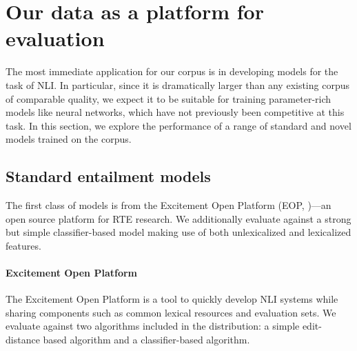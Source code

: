 \section{Our data as a platform for evaluation}

The most immediate application for our corpus is in developing models for the task of NLI. In particular, since it is dramatically larger than any existing corpus of comparable quality, we expect it to be suitable for training parameter-rich models like neural networks, which have not previously been competitive at this task. In this section, we explore the performance of a range of standard and novel models trained on the corpus.

\subsection{Standard entailment models}

The first class of models is from the Excitement Open
  Platform (EOP,
  \citealt{pado2014design,magnini2014excitement})---an open source platform for RTE research.
We additionally evaluate against a strong but simple classifier-based model 
  making use of both unlexicalized and lexicalized features.

%
%
\paragraph{Excitement Open Platform}
The Excitement Open Platform is a tool to quickly develop NLI systems
  while sharing components such as common lexical resources and 
  evaluation sets.
We evaluate against two algorithms included in the distribution:
  a simple edit-distance based algorithm and
  a classifier-based algorithm.

